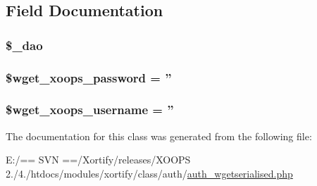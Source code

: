 \subsection{Field Documentation}
\hypertarget{class_xortify_auth_wgetserialised_a12a029c610f699b4b25e79a1f64a3485}{
\subsubsection[{\$\-\_\-dao}]{\setlength{\rightskip}{0pt plus 5cm}\$\-\_\-dao}}\label{class_xortify_auth_wgetserialised_a12a029c610f699b4b25e79a1f64a3485}
\hypertarget{class_xortify_auth_wgetserialised_ab9145a618042e8282ecb90d5f634311f}{
\subsubsection[{\$wget\-\_\-xoops\-\_\-password}]{\setlength{\rightskip}{0pt plus 5cm}\$wget\-\_\-xoops\-\_\-password = ''}}\label{class_xortify_auth_wgetserialised_ab9145a618042e8282ecb90d5f634311f}
\hypertarget{class_xortify_auth_wgetserialised_a237f5dcc3c161c5b1909327a90b56618}{
\subsubsection[{\$wget\-\_\-xoops\-\_\-username}]{\setlength{\rightskip}{0pt plus 5cm}\$wget\-\_\-xoops\-\_\-username = ''}}\label{class_xortify_auth_wgetserialised_a237f5dcc3c161c5b1909327a90b56618}


The documentation for this class was generated from the following file\-:\begin{DoxyCompactItemize}
\item 
E\-:/== S\-V\-N ==/\-Xortify/releases/\-X\-O\-O\-P\-S 2./4./htdocs/modules/xortify/class/auth/\hyperlink{auth__wgetserialised_8php}{auth\-\_\-wgetserialised.\-php}\end{DoxyCompactItemize}
